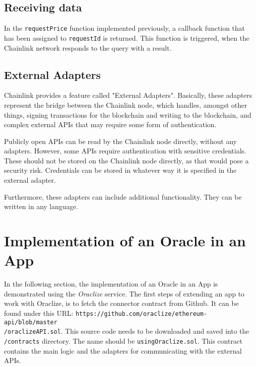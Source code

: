 \subsection*{Receiving data}
In the \texttt{requestPrice} function implemented previously, a callback function that has been assigned to \texttt{requestId} is returned. This function is triggered, when the Chainlink network responds to the query with a result. 
\subsection*{External Adapters}
Chainlink provides a feature called "External Adapters". Basically, these adapters represent the bridge between the Chainlink node, which handles, amongst other things, signing transactions for the blockchain and writing to the blockchain, and complex external APIs that may require some form of authentication.

Publicly open APIs can be read by the Chainlink node directly, without any adapters. However, some APIs require authentication with sensitive credentials. These should not be stored on the Chainlink node directly, as that would pose a security risk. Credentials can be stored in whatever way it is specified in the external adapter.

Furthermore, these adapters can include additional functionality. They can be written in any language\cite{chainlinkdoc}.

\section{Implementation of an Oracle in an App}
In the following section, the implementation of an Oracle in an App is demonstrated using the \emph{Oraclize} service. The first steps of extending an app to work with Oraclize, is to fetch the connector contract from Github. It can be found under this URL: \texttt{https://github.com/oraclize/ethereum-api/blob/master
\\
/oraclizeAPI.sol}. This source code needs to be downloaded and saved into the \texttt{/contracts} directory. The name should be \texttt{usingOraclize.sol}. This contract contains the main logic and the adapters for communicating with the external APIs.

